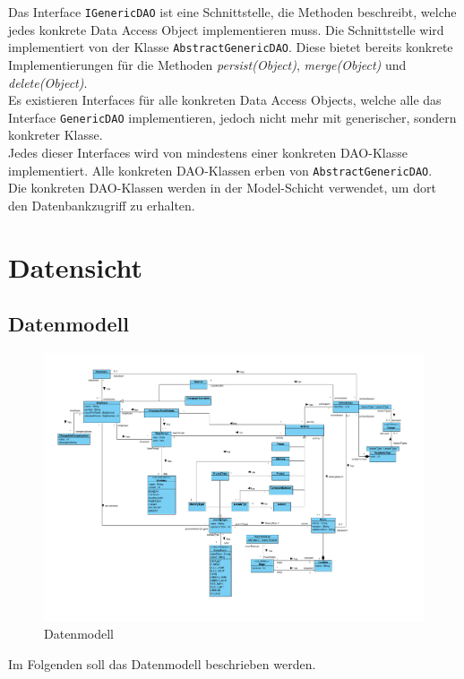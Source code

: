 \documentclass[fontsize=12pt,paper=a4,twoside]{scrartcl}
\begin{document}
Das Interface \texttt{IGenericDAO} ist eine Schnittstelle, die Methoden beschreibt, welche jedes konkrete Data Access Object implementieren muss. Die Schnittstelle wird implementiert von der Klasse \texttt{AbstractGenericDAO}. Diese bietet bereits konkrete Implementierungen für die Methoden \textit{persist(Object)}, \textit{merge(Object)} und \textit{delete(Object)}. \\
Es existieren Interfaces für alle konkreten Data Access Objects, welche alle das Interface \texttt{GenericDAO} implementieren, jedoch nicht mehr mit generischer, sondern konkreter Klasse. \\
Jedes dieser Interfaces wird von mindestens einer konkreten DAO-Klasse implementiert. Alle konkreten DAO-Klassen erben von \texttt{AbstractGenericDAO}.\\
Die konkreten DAO-Klassen werden in der Model-Schicht verwendet, um dort den Datenbankzugriff zu erhalten.

\section{Datensicht}
\label{sec:datensicht}
  
\subsection{Datenmodell}

\begin{figure}[H]
\includegraphics[width=\textwidth]{datenmodell.pdf}
\caption{Datenmodell}
\end{figure}
Im Folgenden soll das Datenmodell beschrieben werden.\\
\end{document}
